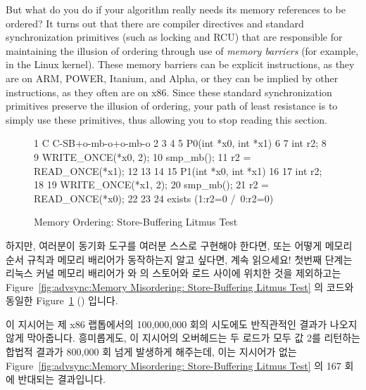 But what do you do if your algorithm really needs its memory
references to be ordered?
It turns out that there are compiler directives and standard
synchronization primitives (such as locking and RCU)
that are responsible for maintaining the illusion of ordering through use of
\emph{memory barriers} (for example,  in the Linux kernel).
These memory barriers can be explicit instructions, as they are on
ARM, POWER, Itanium, and Alpha, or they can be implied by other instructions,
as they often are on x86.
Since these standard synchronization primitives preserve the illusion of
ordering, your path of least resistance is to simply use these primitives,
thus allowing you to stop reading this section.
\fi

\begin{figure}
{ \scriptsize
\begin{verbbox}
 1 C C-SB+o-mb-o+o-mb-o
 2 {
 3 }
 4
 5 P0(int *x0, int *x1)
 6 {
 7   int r2;
 8
 9   WRITE_ONCE(*x0, 2);
10   smp_mb();
11   r2 = READ_ONCE(*x1);
12 }
13
14
15 P1(int *x0, int *x1)
16 {
17   int r2;
18
19   WRITE_ONCE(*x1, 2);
20   smp_mb();
21   r2 = READ_ONCE(*x0);
22 }
23
24 exists (1:r2=0 /\ 0:r2=0)
\end{verbbox}
}
\centering
\theverbbox
\caption{Memory Ordering: Store-Buffering Litmus Test}
\label{fig:advsync:Memory Ordering: Store-Buffering Litmus Test}
\end{figure}

하지만, 여러분이 동기화 도구를 여러분 스스로 구현해야 한다면, 또는 어떻게
메모리 순서 규칙과 메모리 배리어가 동작하는지 알고 싶다면, 계속 읽으세요!
첫번째 단계는  리눅스 커널 메모리 배리어가  와 
의 스토어와 로드 사이에 위치한 것을 제외하고는
Figure~\ref{fig:advsync:Memory Misordering: Store-Buffering Litmus Test} 의
코드와 동일한
Figure~\ref{fig:advsync:Memory Ordering: Store-Buffering Litmus Test}
() 입니다.

이 지시어는 제 x86 랩톱에서의 100,000,000 회의 시도에도 반직관적인 결과가
나오지 않게 막아줍니다.
흥미롭게도, 이 지시어의 오버헤드는 두 로드가 모두 값 2를 리턴하는 합법적 결과가
800,000 회 넘게 발생하게 해주는데, 이는 지시어가 없는
Figure~\ref{fig:advsync:Memory Misordering: Store-Buffering Litmus Test} 의 167
회에 반대되는 결과입니다.
\iffalse

